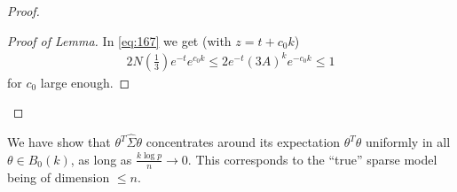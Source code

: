 \begin{proof}
\begin{proof}[Proof of Lemma]
    In \eqref{eq:167} we get (with $z = t+ c_{0} k$)
    \begin{align}
      \label{eq:181}
      2 N(\frac{1}{3}) e^{-t} e^{c_{0} k} \leq 2e^{-t} (3A)^{k}
      e^{-c_{0} k} \leq 1
    \end{align} for $c_{0}$ large enough. 
  \end{proof}
\end{proof}

\begin{remark}
  We have show that $\theta^{T} \hat \Sigma \theta$ concentrates
  around its expectation $\theta^{T} \theta$ uniformly in all $\theta
  \in B_{0}(k)$, as long as $\frac{k \log p}{n} \rightarrow 0$. This
  corresponds to the ``true'' sparse model being of dimension $\leq
  n$.

  
\end{remark}

